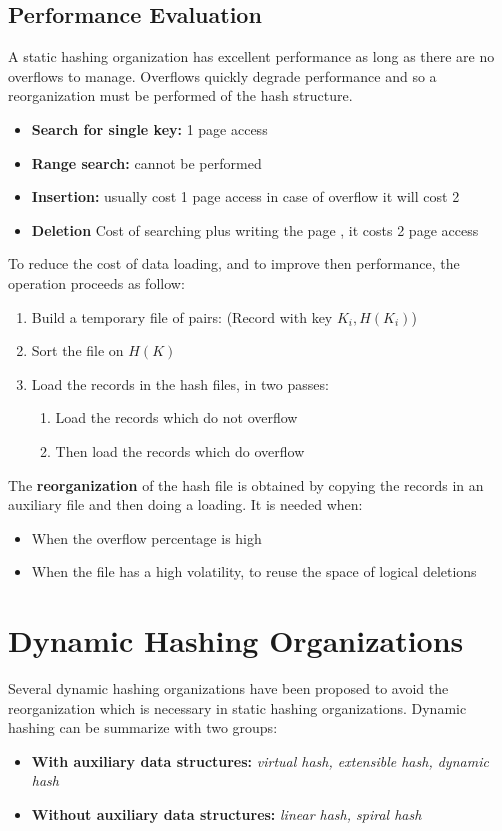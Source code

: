 \subsection{Performance Evaluation}
A static hashing organization has excellent performance as long as there are no overflows to manage. Overflows quickly degrade performance and so a reorganization must be performed of the hash structure.
\begin{itemize}
    \item \textbf{Search for single key:} 1 page access
    \item \textbf{Range search:} cannot be performed
    \item \textbf{Insertion:} usually cost 1 page access in case of overflow it will cost 2
    \item \textbf{Deletion} Cost of searching plus writing the page , it costs 2 page access
\end{itemize}
To reduce the cost of data loading, and to improve then performance, the operation proceeds as follow:
\begin{enumerate}
    \item Build a temporary file of pairs: (Record with key \(K_i, H(K_i)\))
    \item  Sort the file on \(H(K)\) 
    \item Load the records in the hash files, in two passes:
    \begin{enumerate}
        \item Load the records which do not overflow
        \item Then load the records which do overflow
    \end{enumerate}
\end{enumerate}
The \textbf{reorganization} of the hash file is obtained by copying the records in an auxiliary file and then doing a loading. It is needed when:
\begin{itemize}
    \item When the overflow percentage is high
    \item When the file has a high volatility, to reuse the space of logical deletions
\end{itemize}

\section{Dynamic Hashing Organizations}
Several dynamic hashing organizations have been proposed to avoid the reorganization which is necessary in static hashing organizations. Dynamic hashing can be summarize with two groups:
\begin{itemize}
    \item \textbf{With auxiliary data structures:} \textit{virtual hash, extensible hash, dynamic hash}
    \item \textbf{Without auxiliary data structures:} \textit{linear hash, spiral hash}
\end{itemize}

